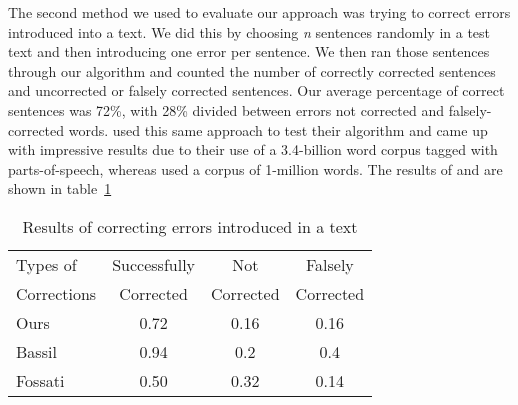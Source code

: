 \documentclass[twocolumn]{article}
\begin{document}
The second method we used to evaluate our approach was trying to correct errors introduced into a text. We did this by choosing \emph{n} sentences randomly in a test text and then introducing one error per sentence. We then ran those sentences through our algorithm and counted the number of correctly corrected sentences and uncorrected or falsely corrected sentences. Our average percentage of correct sentences was 72\%, with 28\% divided between errors not corrected and falsely-corrected words. \cite{Bassil12} used this same approach to test their algorithm and came up with impressive results due to their use of a 3.4-billion word corpus tagged with parts-of-speech, whereas \cite{Fossati07} used a corpus of 1-million words. The results of \cite{Bassil12} and \cite{Fossati07} are shown in table~\ref{text}

\begin{table}[t]
\centering
\begin{tabular}{ | l | c | c | c | }
\hline
Types of & Successfully & Not & Falsely \\
Corrections & Corrected & Corrected & Corrected \\
\hline
Ours & 0.72 & 0.16 & 0.16 \\
\hline
Bassil\cite{Bassil12} & 0.94 & 0.2 & 0.4 \\
\hline
Fossati\cite{Fossati07} & 0.50 & 0.32 & 0.14 \\
\hline
\end{tabular}
\caption{Results of correcting errors introduced in a text}
\label{text}
\end{table}
\end{document}
